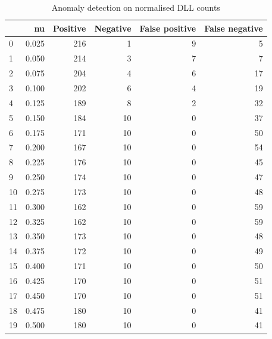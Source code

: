 \documentclass[a4paper,twoside,12pt]{book}
\begin{document}
\begin{appendices}
\begin{table}
	\centering
	\caption{Anomaly detection on normalised DLL counts}
	\label{id:tab:countOCSVM}
	\begin{tabular}{lrrrrr}
		\toprule
		{} &     nu &  Positive &  Negative &  False positive &  False negative \\
		\midrule
		0  &  0.025 &       216 &         1 &               9 &               5 \\
		1  &  0.050 &       214 &         3 &               7 &               7 \\
		2  &  0.075 &       204 &         4 &               6 &              17 \\
		3  &  0.100 &       202 &         6 &               4 &              19 \\
		4  &  0.125 &       189 &         8 &               2 &              32 \\
		5  &  0.150 &       184 &        10 &               0 &              37 \\
		6  &  0.175 &       171 &        10 &               0 &              50 \\
		7  &  0.200 &       167 &        10 &               0 &              54 \\
		8  &  0.225 &       176 &        10 &               0 &              45 \\
		9  &  0.250 &       174 &        10 &               0 &              47 \\
		10 &  0.275 &       173 &        10 &               0 &              48 \\
		11 &  0.300 &       162 &        10 &               0 &              59 \\
		12 &  0.325 &       162 &        10 &               0 &              59 \\
		13 &  0.350 &       173 &        10 &               0 &              48 \\
		14 &  0.375 &       172 &        10 &               0 &              49 \\
		15 &  0.400 &       171 &        10 &               0 &              50 \\
		16 &  0.425 &       170 &        10 &               0 &              51 \\
		17 &  0.450 &       170 &        10 &               0 &              51 \\
		18 &  0.475 &       180 &        10 &               0 &              41 \\
		19 &  0.500 &       180 &        10 &               0 &              41 \\

\end{tabular}
\end{table}
\end{appendices}
\end{document}

